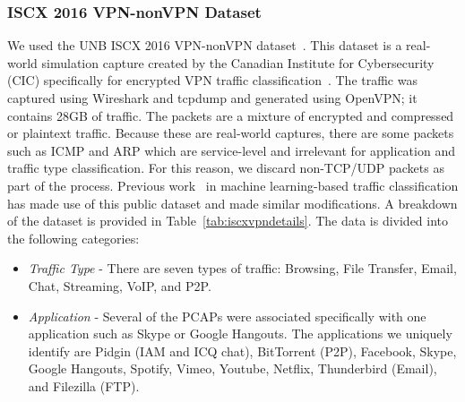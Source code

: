 \subsubsection{ISCX 2016 VPN-nonVPN Dataset}
We used the UNB ISCX 2016 VPN-nonVPN dataset~\cite{vpn-dataset}. This dataset is a real-world simulation capture created by the Canadian Institute for Cybersecurity (CIC) specifically for encrypted VPN traffic classification~\cite{iscx-vpn-paper}. The traffic was captured using Wireshark and tcpdump and generated using OpenVPN; it contains 28GB of traffic. The packets are a mixture of encrypted and compressed or plaintext traffic. Because these are real-world captures, there are some packets such as ICMP and ARP which are service-level and irrelevant for application and traffic type classification. For this reason, we discard non-TCP/UDP packets as part of the process. Previous work~\cite{deeppacket, Zhou2020, Song2019} in machine learning-based traffic classification has made use of this public dataset and made similar modifications. A breakdown of the dataset is provided in Table~\ref{tab:iscxvpndetails}. The data is divided into the following categories:
\begin{itemize}
    \item \textit{Traffic Type} - There are seven types of traffic: Browsing, File Transfer, Email, Chat, Streaming, VoIP, and P2P.
    \item \textit{Application} - Several of the PCAPs were associated specifically with one application such as Skype or Google Hangouts. The applications we uniquely identify are Pidgin (IAM and ICQ chat), BitTorrent (P2P), Facebook, Skype, Google Hangouts, Spotify, Vimeo, Youtube, Netflix, Thunderbird (Email), and Filezilla (FTP).
\end{itemize}

